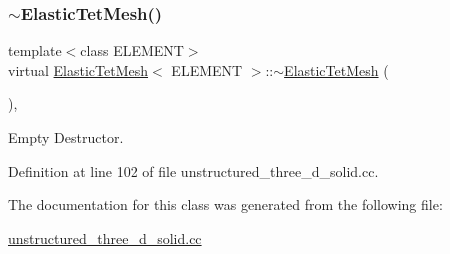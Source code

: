 \subsubsection{\texorpdfstring{$\sim$\+Elastic\+Tet\+Mesh()}{~ElasticTetMesh()}}
{\footnotesize\ttfamily template$<$class E\+L\+E\+M\+E\+NT$>$ \\
virtual \hyperlink{classElasticTetMesh}{Elastic\+Tet\+Mesh}$<$ E\+L\+E\+M\+E\+NT $>$\+::$\sim$\hyperlink{classElasticTetMesh}{Elastic\+Tet\+Mesh} (\begin{DoxyParamCaption}{ }\end{DoxyParamCaption})\hspace{0.3cm}{\ttfamily [inline]}, {\ttfamily [virtual]}}



Empty Destructor. 



Definition at line 102 of file unstructured\+\_\+three\+\_\+d\+\_\+solid.\+cc.



The documentation for this class was generated from the following file\+:\begin{DoxyCompactItemize}
\item 
\hyperlink{unstructured__three__d__solid_8cc}{unstructured\+\_\+three\+\_\+d\+\_\+solid.\+cc}\end{DoxyCompactItemize}
